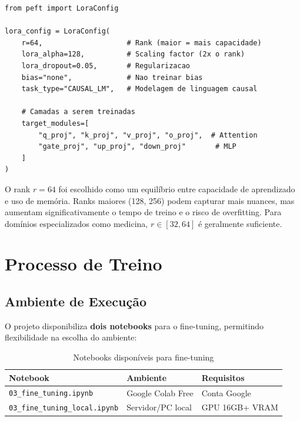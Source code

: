 \begin{lstlisting}[caption={Configuração LoRA para o fine-tuning}, label={lst:lora-config}]
from peft import LoraConfig

lora_config = LoraConfig(
    r=64,                    # Rank (maior = mais capacidade)
    lora_alpha=128,          # Scaling factor (2x o rank)
    lora_dropout=0.05,       # Regularizacao
    bias="none",             # Nao treinar bias
    task_type="CAUSAL_LM",   # Modelagem de linguagem causal

    # Camadas a serem treinadas
    target_modules=[
        "q_proj", "k_proj", "v_proj", "o_proj",  # Attention
        "gate_proj", "up_proj", "down_proj"       # MLP
    ]
)
\end{lstlisting}

\begin{infobox}
O rank $r=64$ foi escolhido como um equilíbrio entre capacidade de aprendizado e uso de memória. Ranks maiores (128, 256) podem capturar mais nuances, mas aumentam significativamente o tempo de treino e o risco de overfitting. Para domínios especializados como medicina, $r \in [32, 64]$ é geralmente suficiente.
\end{infobox}

\section{Processo de Treino}
\label{sec:processo-treino}

\subsection{Ambiente de Execução}

O projeto disponibiliza \textbf{dois notebooks} para o fine-tuning, permitindo flexibilidade na escolha do ambiente:

\begin{table}[H]
\centering
\caption{Notebooks disponíveis para fine-tuning}
\label{tab:notebooks-finetuning}
\begin{tabular}{lp{5cm}l}
\toprule
\textbf{Notebook} & \textbf{Ambiente} & \textbf{Requisitos} \\
\midrule
\texttt{03\_fine\_tuning.ipynb} & Google Colab Free & Conta Google \\
\texttt{03\_fine\_tuning\_local.ipynb} & Servidor/PC local & GPU 16GB+ VRAM \\
\bottomrule
\end{tabular}
\end{table}

